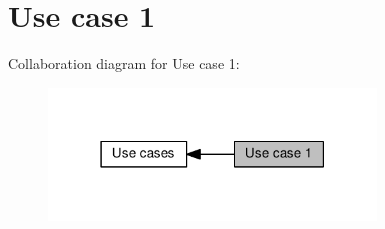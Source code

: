 \hypertarget{group__usecase1}{}\section{Use case 1}
\label{group__usecase1}
Collaboration diagram for Use case 1\+:
\nopagebreak
\begin{figure}[H]
\begin{center}
\leavevmode
\includegraphics[width=247pt]{group__usecase1}
\end{center}
\end{figure}



